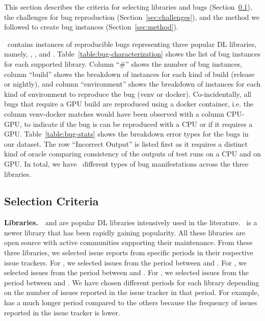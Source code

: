\documentclass[sigconf,screen]{acmart}
\begin{document}
This section describes the criteria for selecting libraries and bugs
(Section~\ref{sec:selection-criterion}), the challenges for bug
reproduction (Section~\ref{sec:challenges}), and the method we
followed to create bug instances (Section~\ref{sec:method}).

\tname\ contains \numbugs{} instances of reproducible bugs
representing three popular DL libraries, namely, \jax, \tf, and
\torch. Table~\ref{table:bug-characterization} shows the list of bug
instances for each supported library. Column ``\#'' shows the number
of bug instances, column ``build'' shows the breakdown of instances
for each kind of build (release or nightly), and column
``environment'' shows the breakdown of instances for each kind of
environment to reproduce the bug (venv or docker). Co-incidentally,
all bugs that require a GPU build are reproduced using a docker
container, i.e. the column venv-docker matches would have been
observed with a column CPU-GPU, to indicate if the bug is can be
reproduced with a CPU or if it requires a
GPU. Table~\ref{table:bug-stats} shows the breakdown error types for
the bugs in our dataset. The row ``Incorrect Output'' is listed first
as it requires a distinct kind of oracle comparing consistency of the
outputs of test runs on a CPU and on GPU. In total, we have
\numbugtypes\ different types of bug manifestations across the three
libraries.

\subsection{Selection Criteria}
\label{sec:selection-criterion}


\textbf{Libraries.}~\torch~and \tf are popular DL libraries
intensively used in the literature. \jax\ is a newer library that has
been rapidly gaining popularity. All these libraries are open source
with active communities supporting their maintenance. From these three
libraries, we selected issue reports from specific periods in their
respective issue trackers. For \torch, we selected issues from the
period between \torchfrom and \torchto. For \tf, we selected issues
from the period between \tffrom and \tfto. For \jax, we selected
issues from the period between \jaxfrom and \jaxto. We have chosen
different periods for each library depending on the number of issues
reported in the issue tracker in that period. For example, \tf has a
much longer period compared to the others because the frequency of
issues reported in the issue tracker is lower.
\end{document}

